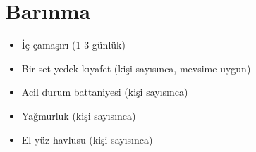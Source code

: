 \chapter*{Barınma}

\begin{itemize}
	\item İç çamaşırı (1-3 günlük)
	\item Bir set yedek kıyafet (kişi sayısınca, mevsime uygun)
	\item Acil durum battaniyesi (kişi sayısınca)
	\item Yağmurluk (kişi sayısınca)
	\item El yüz havlusu (kişi sayısınca)
\end{itemize}
